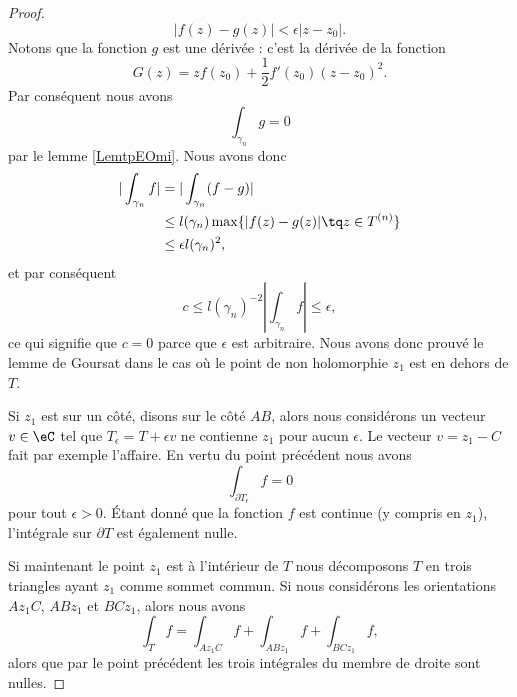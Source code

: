 \begin{proof}
    \begin{equation}
        | f(z)-g(z) |<\epsilon| z-z_0 |.
    \end{equation}
    Notons que la fonction \( g\) est une dérivée : c'est la dérivée de la fonction
    \begin{equation}
        G(z)=zf(z_0)+\frac{ 1 }{2}f'(z_0)(z-z_0)^2.
    \end{equation}
    Par conséquent nous avons
    \begin{equation}
        \int_{\gamma_n}g=0
    \end{equation}
    par le lemme \ref{LemtpEOmi}. Nous avons donc
    \begin{subequations}
        \begin{align}
            | \int_{\gamma_n}f |&=|\int_{\gamma_n}(f-g)|\\
            &\leq l(\gamma_n)\max\{ | f(z)-g(z) |\tq z\in T^{(n)} \}\\
            &\leq \epsilon l(\gamma_n)^2,
        \end{align}
    \end{subequations}
    et par conséquent
    \begin{equation}
        c\leq l(\gamma_n)^{-2}| \int_{\gamma_n}f |\leq \epsilon,
    \end{equation}
    ce qui signifie que \( c=0\) parce que \( \epsilon\) est arbitraire. Nous avons donc prouvé le lemme de Goursat dans le cas où le point de non holomorphie \( z_1\) est en dehors de \( T\).

    Si \( z_1\) est sur un côté, disons sur le côté \( AB\), alors nous considérons un vecteur \( v\in \eC\) tel que \( T_{\epsilon}=T+\epsilon v\) ne contienne \( z_1\) pour aucun \( \epsilon\). Le vecteur \( v=z_1-C\) fait par exemple l'affaire. En vertu du point précédent nous avons
    \begin{equation}
        \int_{\partial T_{\epsilon}}f=0
    \end{equation}
    pour tout \( \epsilon>0\). Étant donné que la fonction \( f\) est continue (y compris en \( z_1\)), l'intégrale sur \( \partial T\) est également nulle.

    Si maintenant le point \( z_1\) est à l'intérieur de \( T\) nous décomposons \( T\) en trois triangles ayant \( z_1\) comme sommet commun. Si nous considérons les orientations \( Az_1C\), \( ABz_1\) et \( BCz_1\), alors nous avons
    \begin{equation}
        \int_Tf=\int_{Az_1C}f+\int_{ABz_1}f+\int_{BCz_1}f,
    \end{equation}
    alors que par le point précédent les trois intégrales du membre de droite sont nulles.
\end{proof}

